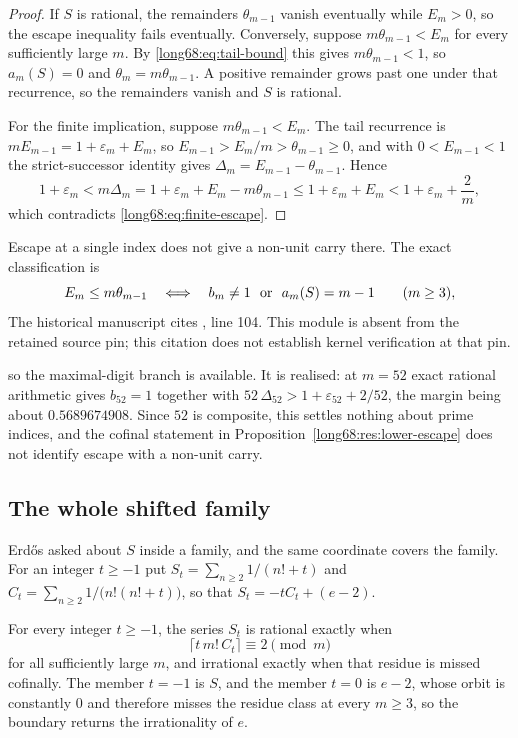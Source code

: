 \documentclass[11pt]{article}
\newcommand{\Ser}{S}
\begin{document}
\begin{proof}
If $\Ser$ is rational, the remainders $\theta_{m-1}$ vanish eventually while
$E_m>0$, so the escape inequality fails eventually.  Conversely, suppose
$m\theta_{m-1}<E_m$ for every sufficiently large $m$.  By
\eqref{long68:eq:tail-bound} this gives $m\theta_{m-1}<1$, so $a_m(\Ser)=0$ and
$\theta_m=m\theta_{m-1}$.  A positive remainder grows past one under that
recurrence, so the remainders vanish and $\Ser$ is rational.

For the finite implication, suppose $m\theta_{m-1}<E_m$.  The tail recurrence
is $mE_{m-1}=1+\varepsilon_m+E_m$, so $E_{m-1}>E_m/m>\theta_{m-1}\ge0$, and
with $0<E_{m-1}<1$ the strict-successor identity gives
$\Delta_m=E_{m-1}-\theta_{m-1}$.  Hence
\[
 1+\varepsilon_m<m\Delta_m=1+\varepsilon_m+E_m-m\theta_{m-1}
 \le1+\varepsilon_m+E_m<1+\varepsilon_m+\frac2m,
\]
which contradicts \eqref{long68:eq:finite-escape}.
\end{proof}

Escape at a single index does not give a non-unit carry there.  The exact
classification is
\begin{equation}\label{long68:eq:escape-classification}
 E_m\le m\theta_{m-1}
 \quad\Longleftrightarrow\quad
 b_m\ne1\ \hbox{ or }\ a_m(\Ser)=m-1
 \qquad(m\ge3),
\end{equation}
  The historical manuscript cites , line 104. This module is absent from the retained source pin; this citation does not establish kernel verification at that pin.

so the maximal-digit branch is available.  It is realised: at $m=52$ exact
rational arithmetic gives $b_{52}=1$ together with
$52\,\Delta_{52}>1+\varepsilon_{52}+2/52$, the margin being about
$0.5689674908$.  Since $52$ is composite, this settles nothing about
prime indices, and the cofinal statement in
Proposition~\ref{long68:res:lower-escape} does not identify escape with a non-unit
carry.

\subsection{The whole shifted family}

Erd\H{o}s asked about $\Ser$ inside a family, and the same coordinate covers
the family.  For an integer $t\ge-1$ put
$\Ser_t=\sum_{n\ge2}1/(n!+t)$ and $C_t=\sum_{n\ge2}1/\bigl(n!(n!+t)\bigr)$,
so that $\Ser_t=-tC_t+(e-2)$.

\begin{theorem}\label{long68:res:shift-family}
For every integer $t\ge-1$, the series $\Ser_t$ is rational exactly when
\[
 \bigl\lceil t\,m!\,C_t\bigr\rceil\equiv2\pmod m
\]
for all sufficiently large $m$, and irrational exactly when that residue is
missed cofinally.  The member $t=-1$ is $\Ser$, and the member $t=0$ is
$e-2$, whose orbit is constantly $0$ and therefore misses the residue class
at every $m\ge3$, so the boundary returns the irrationality of $e$.
\end{theorem}
\end{document}
